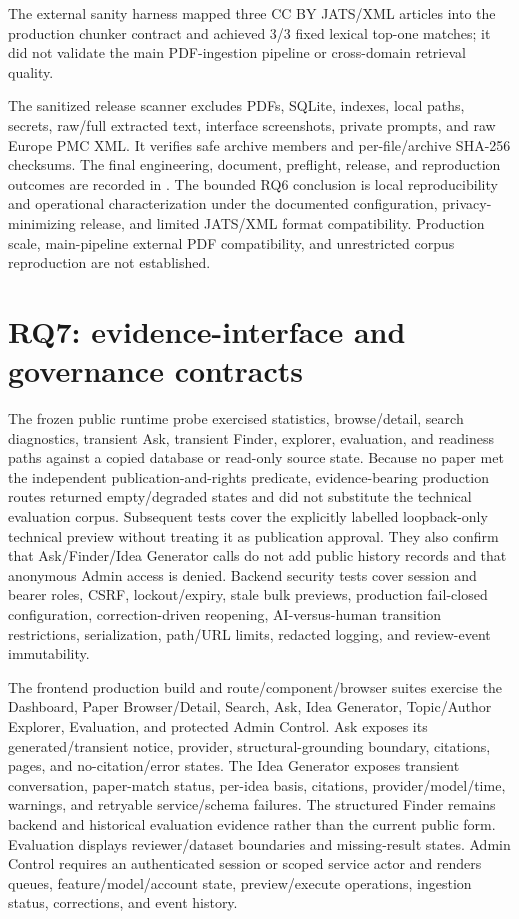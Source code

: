 The external sanity harness mapped three CC BY JATS/XML articles into the production chunker contract and achieved 3/3 fixed lexical top-one matches; it did not validate the main PDF-ingestion pipeline or cross-domain retrieval quality.

The sanitized release scanner excludes PDFs, SQLite, indexes, local paths, secrets, raw/full extracted text, interface screenshots, private prompts, and raw Europe PMC XML. It verifies safe archive members and per-file/archive SHA-256 checksums. The final engineering, document, preflight, release, and reproduction outcomes are recorded in . The bounded RQ6 conclusion is local reproducibility and operational characterization under the documented configuration, privacy-minimizing release, and limited JATS/XML format compatibility. Production scale, main-pipeline external PDF compatibility, and unrestricted corpus reproduction are not established.

\section{RQ7: evidence-interface and governance contracts}

The frozen public runtime probe exercised statistics, browse/detail, search diagnostics, transient Ask, transient Finder, explorer, evaluation, and readiness paths against a copied database or read-only source state. Because no paper met the independent publication-and-rights predicate, evidence-bearing production routes returned empty/degraded states and did not substitute the technical evaluation corpus. Subsequent tests cover the explicitly labelled loopback-only technical preview without treating it as publication approval. They also confirm that Ask/Finder/Idea Generator calls do not add public history records and that anonymous Admin access is denied. Backend security tests cover session and bearer roles, CSRF, lockout/expiry, stale bulk previews, production fail-closed configuration, correction-driven reopening, AI-versus-human transition restrictions, serialization, path/URL limits, redacted logging, and review-event immutability.

The frontend production build and route/component/browser suites exercise the Dashboard, Paper Browser/Detail, Search, Ask, Idea Generator, Topic/Author Explorer, Evaluation, and protected Admin Control. Ask exposes its generated/transient notice, provider, structural-grounding boundary, citations, pages, and no-citation/error states. The Idea Generator exposes transient conversation, paper-match status, per-idea basis, citations, provider/model/time, warnings, and retryable service/schema failures. The structured Finder remains backend and historical evaluation evidence rather than the current public form. Evaluation displays reviewer/dataset boundaries and missing-result states. Admin Control requires an authenticated session or scoped service actor and renders queues, feature/model/account state, preview/execute operations, ingestion status, corrections, and event history.

